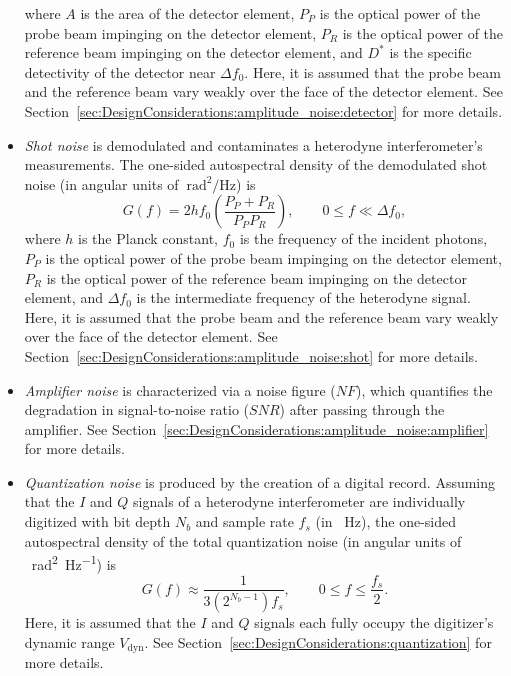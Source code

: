 \begin{itemize}
\begin{equation}
    \end{equation}
    where $A$ is the area of the detector element,
    $P_P$ is the optical power of the probe beam
    impinging on the detector element,
    $P_R$ is the optical power of the reference beam
    impinging on the detector element,
    and $D^*$ is the specific detectivity of the detector near $\Delta f_0$.
    Here, it is assumed that the probe beam and the reference beam
    vary weakly over the face of the detector element.
    See Section~\ref{sec:DesignConsiderations:amplitude_noise:detector}
    for more details.
  \item \emph{Shot noise} is demodulated and
    contaminates a heterodyne interferometer's measurements.
    The one-sided autospectral density of the demodulated shot noise
    (in angular units of $\SI{}{\radian\squared\per\Hz}$) is
    \begin{equation}
      G(f)
      =
      2 h f_0 \left( \frac{P_P + P_R}{P_P P_R} \right),
      \qquad
      0 \leq f \ll \Delta f_0,
      \label{eq:DesignConsiderations:summary:shot_noise_autospectral_density}
    \end{equation}
    where $h$ is the Planck constant,
    $f_0$ is the frequency of the incident photons,
    $P_P$ is the optical power of the probe beam
    impinging on the detector element,
    $P_R$ is the optical power of the reference beam
    impinging on the detector element, and
    $\Delta f_0$ is the intermediate frequency of the heterodyne signal.
    Here, it is assumed that the probe beam and the reference beam
    vary weakly over the face of the detector element.
    See Section~\ref{sec:DesignConsiderations:amplitude_noise:shot}
    for more details.
  \item \emph{Amplifier noise} is characterized via a noise figure ($NF$),
    which quantifies the degradation in signal-to-noise ratio ($SNR$)
    after passing through the amplifier.
    See Section~\ref{sec:DesignConsiderations:amplitude_noise:amplifier}
    for more details.
  \item \emph{Quantization noise} is produced
    by the creation of a digital record.
    Assuming that the $I$ and $Q$ signals of a heterodyne interferometer
    are individually digitized with bit depth $N_b$ and
    sample rate $f_s$ (in \SI{}{\hertz}),
    the one-sided autospectral density of the total quantization noise
    (in angular units of \SI{}{\radian\squared\per\hertz}) is
    \begin{equation}
      G(f)
      \approx
      \frac{1}{3 (2^{N_b - 1}) f_s},
      \qquad
      0 \leq f \leq \frac{f_s}{2}.
      \label{eq:DesignConsiderations:summary:quantization_noise_autospectral_density}
    \end{equation}
    Here, it is assumed that the $I$ and $Q$ signals each fully occupy
    the digitizer's dynamic range $V_{\text{dyn}}$.
    See Section~\ref{sec:DesignConsiderations:quantization}
    for more details.
\end{itemize}




